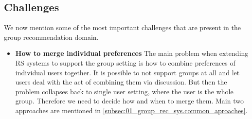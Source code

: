 \subsection{Challenges}\label{subsec:01_group_rec_sys.challenges}

We now mention some of the most important challenges that are present in the group recommendation domain.

\begin{itemize}
    \item \textbf{How to merge individual preferences} \newline
        The main problem when extending RS systems to support the group setting is how to combine preferences of individual users together. It is possible to not support groups at all and let users deal with the act of combining them via discussion. But then the problem collapses back to single user setting, where the user is the whole group. Therefore we need to decide how and when to merge them. Main two approaches are mentioned in \ref{subsec:01_group_rec_sys.common_aproaches}.
        
        

\end{itemize}
